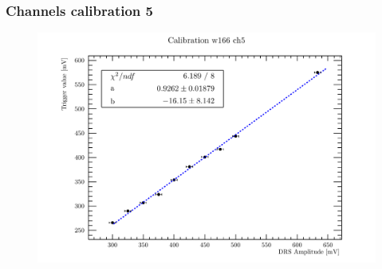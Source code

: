 
\begin{frame} [fragile]
\small
	\frametitle{Channels calibration 5}
    		\begin{figure}
		 \centering
			\includegraphics[scale=0.5]{figures/ch5.pdf}
		\end{figure}  
\end{frame}
